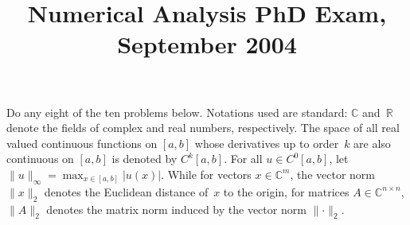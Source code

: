 \documentclass[11pt,letterpaper]{article}
\title{Numerical Analysis PhD Exam, September 2004}
\author{}
\date{}
\newenvironment{examinstructions}{%
  \par\begingroup\itshape
}{%
  \par\endgroup\vspace{0.18em}
}
\begin{document}
\maketitle
\thispagestyle{empty}
\begin{examinstructions}
Do any eight of the ten problems below. Notations used are standard: \(\mathbb{C}\) and~\(\mathbb{R}\) denote the fields of complex and real numbers, respectively. The space of all real valued continuous functions on \([a,b]\) whose derivatives up to order~\(k\) are also continuous on \([a,b]\) is denoted by \(C^k[a,b]\). For all \(u\in C^0[a,b]\), let \(\lVert u\rVert_\infty=\max_{x\in[a,b]}|u(x)|\). While for vectors \(x\in\mathbb{C}^m\), the vector norm \(\lVert x\rVert_2\) denotes the Euclidean distance of~\(x\) to the origin, for matrices \(A\in\mathbb{C}^{n\times n}\), \(\lVert A\rVert_2\) denotes the matrix norm induced by the vector norm \(\lVert\cdot\rVert_2\).
\end{examinstructions}
\end{document}
